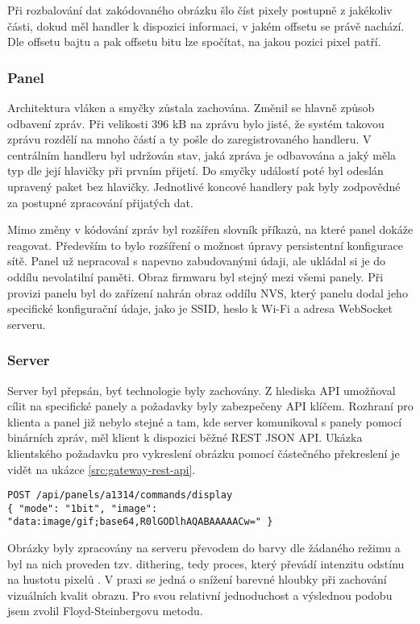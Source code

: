 Při rozbalování dat zakódovaného obrázku šlo číst pixely postupně z jakékoliv části, dokud měl handler k dispozici informaci, v jakém offsetu se právě nachází. Dle offsetu bajtu a pak offsetu bitu lze spočítat, na jakou pozici pixel patří.

\subsubsection{Panel}
Architektura vláken a smyčky zůstala zachována. Změnil se hlavně způsob odbavení zpráv. Při velikosti 396 kB na zprávu bylo jisté, že systém takovou zprávu rozdělí na mnoho částí a ty pošle do zaregistrovaného handleru. V centrálním handleru byl udržován stav, jaká zpráva je odbavována a jaký měla typ dle její hlavičky při prvním přijetí. Do smyčky událostí poté byl odeslán upravený paket bez hlavičky. Jednotlivé koncové handlery pak byly zodpovědné za postupné zpracování přijatých dat.

Mimo změny v kódování zpráv byl rozšířen slovník příkazů, na které panel dokáže reagovat. Především to bylo rozšíření o možnost úpravy persistentní konfigurace sítě. Panel už nepracoval s napevno zabudovanými údaji, ale ukládal si je do oddílu nevolatilní paměti. Obraz firmwaru byl stejný mezi všemi panely. Při provizi panelu byl do zařízení nahrán obraz oddílu NVS, který panelu dodal jeho specifické konfigurační údaje, jako je SSID, heslo k Wi-Fi a adresa WebSocket serveru.

\subsubsection{Server}
Server byl přepsán, byť technologie byly zachovány. Z hlediska API umožňoval cílit na specifické panely a požadavky byly zabezpečeny API klíčem. Rozhraní pro klienta a panel již nebylo stejné a tam, kde server komunikoval s panely pomocí binárních zpráv, měl klient k dispozici běžné REST JSON API. Ukázka klientského požadavku pro vykreslení obrázku pomocí částečného překreslení je vidět na ukázce \ref{src:gateway-rest-api}.

\begin{lstlisting}[label=src:gateway-rest-api,caption={Požadavek na server pro částečné překreslení obrázku ve verzi Birnárních zpráv}]
POST /api/panels/a1314/commands/display
{ "mode": "1bit", "image": "data:image/gif;base64,R0lGODlhAQABAAAAACw=" }
\end{lstlisting}

Obrázky byly zpracovány na serveru převodem do barvy dle žádaného režimu a byl na nich proveden tzv. dithering, tedy proces, který převádí intenzitu odstínu na hustotu pixelů \cite{Dithering}. V praxi se jedná o snížení barevné hloubky při zachování vizuálních kvalit obrazu. Pro svou relativní jednoduchost a výslednou podobu jsem zvolil Floyd-Steinbergovu metodu\cite{knuthDigitalHalftonesDot1987}\cite{hellandImageDitheringEleven2012}.

